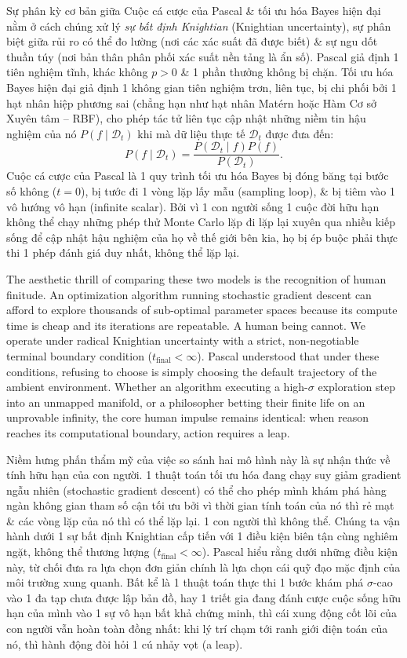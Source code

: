 \documentclass[11pt]{article}
\begin{document}
Sự phân kỳ cơ bản giữa Cuộc cá cược của Pascal \& tối ưu hóa Bayes hiện đại nằm ở cách chúng xử lý \emph{sự bất định Knightian} (Knightian uncertainty), sự phân biệt giữa rủi ro có thể đo lường (nơi các xác suất đã được biết) \& sự ngu dốt thuần túy (nơi bản thân phân phối xác suất nền tảng là ẩn số). Pascal giả định 1 tiên nghiệm tĩnh, khác không $p > 0$ \& 1 phần thưởng không bị chặn. Tối ưu hóa Bayes hiện đại giả định 1 không gian tiên nghiệm trơn, liên tục, bị chi phối bởi 1 hạt nhân hiệp phương sai (chẳng hạn như hạt nhân Mat\'ern hoặc Hàm Cơ sở Xuyên tâm -- RBF), cho phép tác tử liên tục cập nhật những niềm tin hậu nghiệm của nó $P(f \mid \mathcal{D}_t)$ khi mà dữ liệu thực tế $\mathcal{D}_t$ được đưa đến:
\begin{equation*}
	P(f \mid \mathcal{D}_t) = \frac{P(\mathcal{D}_t \mid f) P(f)}{P(\mathcal{D}_t)}.
\end{equation*}
Cuộc cá cược của Pascal là 1 quy trình tối ưu hóa Bayes bị đóng băng tại bước số không ($t = 0$), bị tước đi 1 vòng lặp lấy mẫu (sampling loop), \& bị tiêm vào 1 vô hướng vô hạn (infinite scalar). Bởi vì 1 con người sống 1 cuộc đời hữu hạn không thể chạy những phép thử Monte Carlo lặp đi lặp lại xuyên qua nhiều kiếp sống để cập nhật hậu nghiệm của họ về thế giới bên kia, họ bị ép buộc phải thực thi 1 phép đánh giá duy nhất, không thể lặp lại.

The aesthetic thrill of comparing these two models is the recognition of human finitude. An optimization algorithm running stochastic gradient descent can afford to explore thousands of sub-optimal parameter spaces because its compute time is cheap and its iterations are repeatable. A human being cannot. We operate under radical Knightian uncertainty with a strict, non-negotiable terminal boundary condition ($t_{\text{final}} < \infty$). Pascal understood that under these conditions, refusing to choose is simply choosing the default trajectory of the ambient environment. Whether an algorithm executing a high-$\sigma$ exploration step into an unmapped manifold, or a philosopher betting their finite life on an unprovable infinity, the core human impulse remains identical: when reason reaches its computational boundary, action requires a leap.

Niềm hưng phấn thẩm mỹ của việc so sánh hai mô hình này là sự nhận thức về tính hữu hạn của con người. 1 thuật toán tối ưu hóa đang chạy suy giảm gradient ngẫu nhiên (stochastic gradient descent) có thể cho phép mình khám phá hàng ngàn không gian tham số cận tối ưu bởi vì thời gian tính toán của nó thì rẻ mạt \& các vòng lặp của nó thì có thể lặp lại. 1 con người thì không thể. Chúng ta vận hành dưới 1 sự bất định Knightian cấp tiến với 1 điều kiện biên tận cùng nghiêm ngặt, không thể thương lượng ($t_{\text{final}} < \infty$). Pascal hiểu rằng dưới những điều kiện này, từ chối đưa ra lựa chọn đơn giản chính là lựa chọn cái quỹ đạo mặc định của môi trường xung quanh. Bất kể là 1 thuật toán thực thi 1 bước khám phá $\sigma$-cao vào 1 đa tạp chưa được lập bản đồ, hay 1 triết gia đang đánh cược cuộc sống hữu hạn của mình vào 1 sự vô hạn bất khả chứng minh, thì cái xung động cốt lõi của con người vẫn hoàn toàn đồng nhất: khi lý trí chạm tới ranh giới điện toán của nó, thì hành động đòi hỏi 1 cú nhảy vọt (a leap).
\end{document}
